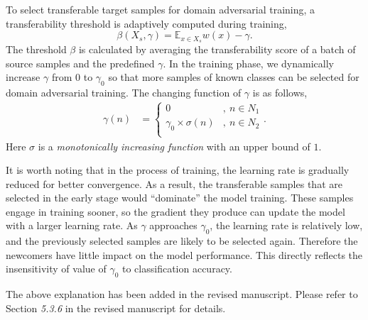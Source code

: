 To select transferable target samples for domain adversarial training, a transferability threshold is adaptively computed during training,  
\begin{equation}
    \label{eq: transferability thresholded}
    \beta(X_s, \gamma) = \mathbb{E}_{x \in X_s} w(x) - \gamma.
\end{equation}
The threshold $\beta$ is calculated by averaging the transferability score of a batch of source samples and the predefined $\gamma$.
In the training phase, we dynamically increase $\gamma$ from $0$ to $\gamma_0$ so that more samples of known classes can be selected for domain adversarial training.
The changing function of $\gamma$ is as follows,
\begin{equation}
    \label{eq: dynamic tolerable range}
    \begin{split}
        \gamma(n) &=
        \begin{cases}
            0 & ,\: n \in N_1 \\
            \gamma_0 \times  \sigma(n) & ,\: n\in N_2 \\
        \end{cases}.
    \end{split}
\end{equation}
Here $\sigma$ is a \textit{monotonically increasing function} with an upper bound of $1$.

It is worth noting that in the process of training, the learning rate is gradually reduced for better convergence.
As a result, the transferable samples that are selected in the early stage would ``dominate'' the model training.
These samples engage in training sooner, so the gradient they produce can update the model with a larger learning rate.
As $\gamma$ approaches $\gamma_0$, the learning rate is relatively low, and the previously selected samples are likely to be selected again.
Therefore the newcomers have little impact on the model performance.
This directly reflects the insensitivity of value of $\gamma_0$ to classification accuracy.

The above explanation has been added in the revised manuscript.
Please refer to Section \textit{5.3.6} in the revised manuscript for details.

\renewcommand\thesection{\arabic{section}}
\setcounter{section}{0}

